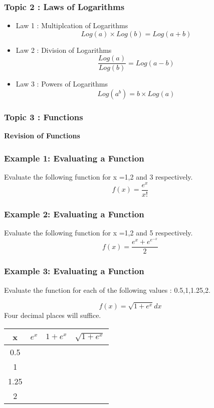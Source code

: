 \documentclass{beamer}
\begin{document}
\begin{frame}
	\frametitle{ Topic 2 : Laws of Logarithms}
	\Large
	\begin{itemize}
		\item Law 1 : Multiplcation of Logarithms
		\[ Log(a) \times Log(b) = Log(a+b) \]
		\item Law 2 : Division of Logarithms
		\[ \frac{Log(a)}{Log(b)} = Log(a-b) \]
		\item Law 3 : Powers of Logarithms
		\[ Log(a^b) = b \times Log(a) \]
	\end{itemize}
	
	
	
\end{frame}

\begin{frame}
	\frametitle{Topic 3 : Functions}
	\textbf{Revision of Functions}
\end{frame}
\begin{frame}
	\frametitle{Example 1: Evaluating a Function}
	Evaluate the following function for x =1,2 and 3 respectively.
	\[ f(x) = \frac{e^x}{x!} \]
\end{frame}
\begin{frame}
	\frametitle{Example 2: Evaluating a Function}
	Evaluate the following function for x =1,2 and 5 respectively.
	\[ f(x) = \frac{e^x + e^{e^{-x}}}{2} \]
\end{frame}
\begin{frame}

\frametitle{Example 3: Evaluating a Function}
Evaluate the function for each of the following values : 0.5,1,1.25,2.

\[f(x) =  \sqrt{1+e^{x}} dx \]
 Four decimal places will suffice.
\end{frame}
\begin{frame}
	\begin{center}
\begin{tabular}{|c|c|c|c|}
	\hline \rule[-2ex]{0pt}{5.5ex} x & $e^x$ & $1+e^x$ & $\sqrt{1+e^x}$ \\ 
	\hline \rule[-2ex]{0pt}{5.5ex} 0.5 & \phantom{space}  &  &  \\ 
	\hline \rule[-2ex]{0pt}{5.5ex} 1 &  &  &  \\ 
	\hline \rule[-2ex]{0pt}{5.5ex} 1.25 & \phantom{space}  &  &  \\ 
	\hline \rule[-2ex]{0pt}{5.5ex} 2 & \phantom{space}  &  & \phantom{space}  \\ 
	\hline 
\end{tabular} 
 \end{center}
\end{frame}
\end{document}
